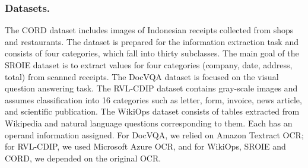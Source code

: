 \documentclass[runningheads]{llncs}
\begin{document}
\subsubsection{Datasets.} The CORD dataset \cite{park2019cord} includes images of Indonesian receipts collected from shops and restaurants. The dataset is prepared for the information extraction task and consists of four categories, which fall into thirty subclasses. The main goal of the SROIE dataset \cite{Huang2019ICDAR2019CO} is to extract values for four categories (company, date, address, total) from scanned receipts. The DocVQA dataset \cite{mathew2020docvqa} is focused on the visual question answering task. The RVL-CDIP dataset \cite{harley2015icdar} contains gray-scale images and assumes classification into 16 categories such as letter, form, invoice, news article, and scientific publication. The WikiOps dataset \cite{Cho2018AdversarialTA} consists of tables extracted from Wikipedia and natural language questions corresponding to them. Each has an operand information assigned. For DocVQA, we relied on Amazon Textract OCR; for RVL-CDIP, we used Microsoft Azure OCR, and for WikiOps, SROIE and CORD, we depended on the original OCR.
\end{document}
